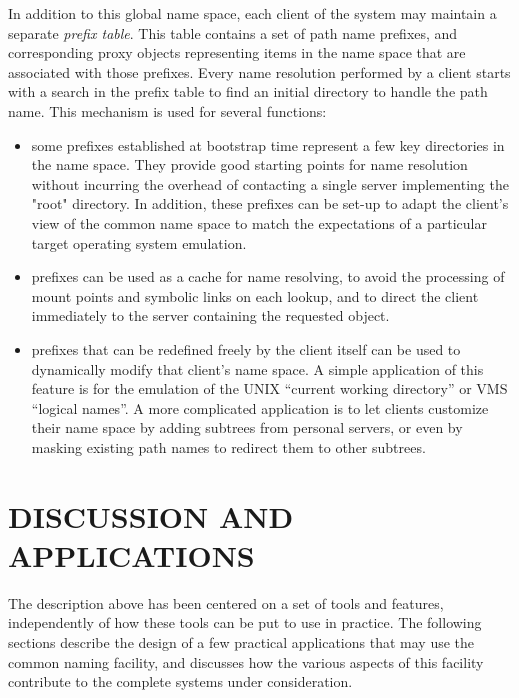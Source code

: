 In addition to this global name space, each client of the system may
maintain a separate {\em prefix table}. This table contains a set of
path name prefixes, and corresponding proxy objects representing items
in the name space that are associated with those prefixes. Every name
resolution performed by a client starts with a search in the prefix
table to find an initial directory to handle the path name. This
mechanism is used for several functions:
\begin{itemize}

\item some prefixes established at bootstrap time represent a few key
directories in the name space. They provide good starting points for
name resolution without incurring the overhead of contacting a single
server implementing the "root" directory. In addition, these prefixes
can be set-up to adapt the client's view of the common name space to
match the expectations of a particular target operating system
emulation.

\item prefixes can be used as a cache for name resolving, to avoid the
processing of mount points and symbolic links on each lookup, and to
direct the client immediately to the server containing the requested
object.

\item prefixes that can be redefined freely by the client itself can
be used to dynamically modify that client's name space. A simple
application of this feature is for the emulation of the UNIX ``current
working directory'' or VMS ``logical names''. A more complicated
application is to let clients customize their name space by adding
subtrees from personal servers, or even by masking existing path names
to redirect them to other subtrees.

\end{itemize}

\section{DISCUSSION AND APPLICATIONS}

The description above has been centered on a set of tools and
features, independently of how these tools can be put to use in
practice. The following sections describe the design of a few
practical applications that may use the common naming facility, and
discusses how the various aspects of this facility contribute to the
complete systems under consideration.

